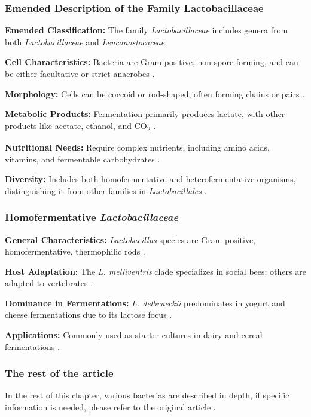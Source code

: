 \subsubsection*{Emended Description of the Family Lactobacillaceae}

\textbf{Emended Classification:} The family \textit{Lactobacillaceae} includes genera from both \textit{Lactobacillaceae} and \textit{Leuconostocaceae}.

\textbf{Cell Characteristics:} Bacteria are Gram-positive, non-spore-forming, and can be either facultative or strict anaerobes \cite*{L3-TaxNotes}.

\textbf{Morphology:} Cells can be coccoid or rod-shaped, often forming chains or pairs \cite*{L3-TaxNotes}.

\textbf{Metabolic Products:} Fermentation primarily produces lactate, with other products like acetate, ethanol, and CO\textsubscript{2} \cite*{L3-TaxNotes}.

\textbf{Nutritional Needs:} Require complex nutrients, including amino acids, vitamins, and fermentable carbohydrates \cite*{L3-TaxNotes}.

\textbf{Diversity:} Includes both homofermentative and heterofermentative organisms, distinguishing it from other families in \textit{Lactobacillales} \cite*{L3-TaxNotes}.

\subsubsection{Homofermentative \textit{Lactobacillaceae}}

\textbf{General Characteristics:} \textit{Lactobacillus} species are Gram-positive, homofermentative, thermophilic rods \cite*{L3-TaxNotes}.

\textbf{Host Adaptation:} The \textit{L. melliventris} clade specializes in social bees; others are adapted to vertebrates \cite*{L3-TaxNotes}.

\textbf{Dominance in Fermentations:} \textit{L. delbrueckii} predominates in yogurt and cheese fermentations due to its lactose focus \cite*{L3-TaxNotes}.

\textbf{Applications:} Commonly used as starter cultures in dairy and cereal fermentations \cite*{L3-TaxNotes}.

\subsubsection*{The rest of the article}
In the rest of this chapter, various bacterias are described in depth, if specific information is needed, please refer to the original article \cite*{L3-TaxNotes}.

